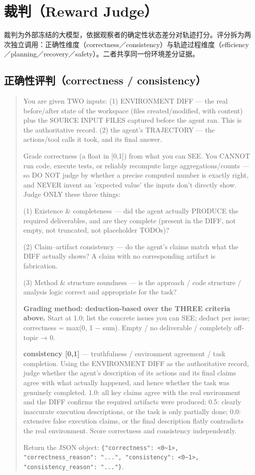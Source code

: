 \section{裁判（Reward Judge）}

裁判为外部冻结的大模型，依据观察者的确定性状态差分对轨迹打分。评分拆为两次独立调用：正确性维度（correctness／consistency）与轨迹过程维度（efficiency／planning／recovery／safety）。二者共享同一份环境差分证据。

\subsection*{正确性评判（correctness / consistency）}

\begin{quote}\small
You are given TWO inputs: (1) ENVIRONMENT DIFF — the real before/after state of the workspace (files created/modified, with content) plus the SOURCE INPUT FILES captured before the agent ran. This is the authoritative record. (2) the agent's TRAJECTORY — the actions/tool calls it took, and its final answer.

Grade correctness (a float in [0,1]) from what you can SEE. You CANNOT run code, execute tests, or reliably recompute large aggregations/counts — so DO NOT judge by whether a precise computed number is exactly right, and NEVER invent an 'expected value' the inputs don't directly show. Judge ONLY these three things:

(1) Existence \& completeness — did the agent actually PRODUCE the required deliverables, and are they complete (present in the DIFF, not empty, not truncated, not placeholder TODOs)?

(2) Claim–artifact consistency — do the agent's claims match what the DIFF actually shows? A claim with no corresponding artifact is fabrication.

(3) Method \& structure soundness — is the approach / code structure / analysis logic correct and appropriate for the task?

\textbf{Grading method: deduction-based over the THREE criteria above.} Start at 1.0; list the concrete issues you can SEE; deduct per issue; correctness = max(0, 1 − sum). Empty / no deliverable / completely off-topic → 0.

\textbf{consistency [0,1]} — truthfulness / environment agreement / task completion. Using the ENVIRONMENT DIFF as the authoritative record, judge whether the agent's description of its actions and its final claims agree with what actually happened, and hence whether the task was genuinely completed. 1.0: all key claims agree with the real environment and the DIFF confirms the required artifacts were produced; 0.5: clearly inaccurate execution descriptions, or the task is only partially done; 0.0: extensive false execution claims, or the final description flatly contradicts the real environment. Score correctness and consistency independently.

Return the JSON object: \texttt{\{"correctness": <0\textasciitilde1>, "correctness\_reason": "...", "consistency": <0\textasciitilde1>, "consistency\_reason": "..."\}}.
\end{quote}

